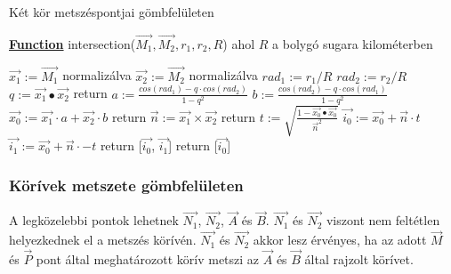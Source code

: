 \begin{algorithm}[H]
	\caption{Két kör metszéspontjai gömbfelületen}
	\label{alg:intersection}
	\textbf{\underline{Function}} intersection($\overrightarrow{M_1}, \overrightarrow{M_2}, r_1, r_2, R$) ahol $R$ a bolygó sugara kilométerben
	\begin{algorithmic}[1]
	\STATE $\overrightarrow{x_1} := \overrightarrow{M_1}$ normalizálva 
	\STATE $\overrightarrow{x_2} := \overrightarrow{M_2}$ normalizálva
	\STATE $rad_1 := r_1 / R$ 
	\STATE $rad_2 := r_2 / R$
	\STATE $q := \overrightarrow{x_1} \bullet \overrightarrow{x_2}$ 
		\STATE return 
	\ENDIF
	\STATE $a := \frac{cos(rad_1) - q \cdot cos(rad_2)}{1 - q^2}$
	\STATE $b := \frac{cos(rad_2) - q \cdot cos(rad_1)}{1 - q^2}$
	\STATE $\overrightarrow{x_0} := \overrightarrow{x_1} \cdot a + \overrightarrow{x_2} \cdot b$
		\STATE return 
	\ENDIF
	\STATE $\overrightarrow{n} := \overrightarrow{x_1} × \overrightarrow{x_2}$
		\STATE return 
	\ENDIF
	\STATE $t := \sqrt{ \frac{1 - \overrightarrow{x_0} \bullet \overrightarrow{x_0}}{\overrightarrow{n}^2}}$
	\STATE $\overrightarrow{i_0} := \overrightarrow{x_0} + \overrightarrow{n} \cdot t$
		\STATE $\overrightarrow{i_1} := \overrightarrow{x_0} + \overrightarrow{n} \cdot -t$
		\STATE return [$\overrightarrow{i_0}$, $\overrightarrow{i_1}$]
	\ELSE
		\STATE return [$\overrightarrow{i_0}$]
	\ENDIF
	\end{algorithmic}
\end{algorithm}

\subsubsection{Körívek metszete gömbfelületen}

A legközelebbi pontok lehetnek $\overrightarrow{N_1}$, $\overrightarrow{N_2}$, $\overrightarrow{A}$ és $\overrightarrow{B}$. $\overrightarrow{N_1}$ és $\overrightarrow{N_2}$ viszont nem feltétlen helyezkednek el a metszés körívén. $\overrightarrow{N_1}$ és $\overrightarrow{N_2}$ akkor lesz érvényes, ha az adott $\overrightarrow{M}$ és $\overrightarrow{P}$ pont által meghatározott körív metszi az $\overrightarrow{A}$ és $\overrightarrow{B}$ által rajzolt körívet.

